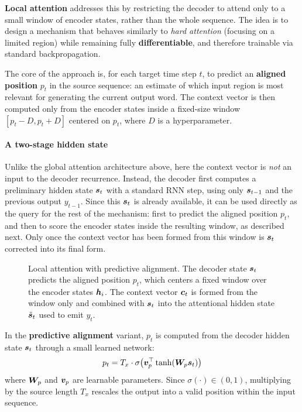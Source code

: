 \textbf{Local attention} addresses this by restricting the decoder to attend only to a small window of encoder states, rather than the whole sequence.
The idea is to design a mechanism that behaves similarly to \textit{hard attention} (focusing on a limited region) while remaining fully \textbf{differentiable}, and therefore trainable via standard backpropagation.

The core of the approach is, for each target time step $t$, to predict an \textbf{aligned position} $p_t$ in the source sequence: an estimate of which input region is most relevant for generating the current output word.
The context vector is then computed only from the encoder states inside a fixed-size window $[p_t - D, p_t + D]$ centered on $p_t$, where $D$ is a hyperparameter.

\paragraph{A two-stage hidden state}
Unlike the global attention architecture above, here the context vector is \textit{not} an input to the decoder recurrence. Instead, the decoder first computes a preliminary hidden state $\boldsymbol{s}_t$ with a standard RNN step, using only $\boldsymbol{s}_{t-1}$ and the previous output $y_{t-1}$. Since this $\boldsymbol{s}_t$ is already available, it can be used directly as the query for the rest of the mechanism: first to predict the aligned position $p_t$, and then to score the encoder states inside the resulting window, as described next. Only once the context vector has been formed from this window is $\boldsymbol{s}_t$ corrected into its final form.

\begin{figure}[H]
    \centering
    
    \caption{Local attention with predictive alignment. The decoder state $\boldsymbol{s}_t$ predicts the aligned position $p_t$, which centers a fixed window over the encoder states $\boldsymbol{h}_i$. The context vector $\boldsymbol{c}_t$ is formed from the window only and combined with $\boldsymbol{s}_t$ into the attentional hidden state $\tilde{\boldsymbol{s}}_t$ used to emit $y_t$.}
\end{figure}

In the \textbf{predictive alignment} variant, $p_t$ is computed from the decoder hidden state $\boldsymbol{s}_t$ through a small learned network:
\[
p_t = T_x \cdot \sigma\!\left(\boldsymbol{v}_p^\top \tanh(\boldsymbol{W}_p \boldsymbol{s}_t)\right)
\]
where $\boldsymbol{W}_p$ and $\boldsymbol{v}_p$ are learnable parameters.
Since $\sigma(\cdot) \in (0, 1)$, multiplying by the source length $T_x$ rescales the output into a valid position within the input sequence.

